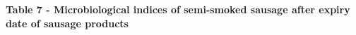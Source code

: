 % 
% 
% 
% 
% 

{\bfseries Table 7 - Microbiological indices of semi-smoked sausage after
expiry date of sausage products}

